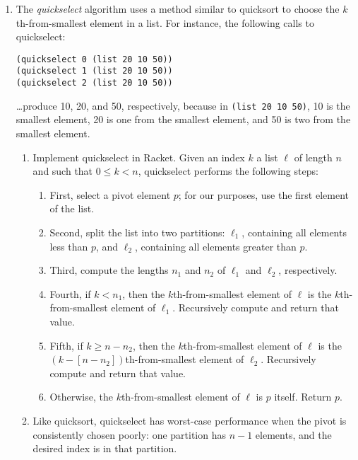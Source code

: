 \documentclass{article}
\begin{document}
\begin{enumerate}

  \pagebreak[2]
\item
  The \emph{quickselect} algorithm uses a method similar to quicksort to choose
  the \(k\)th-from-smallest element in a list.  For instance, the following
  calls to quickselect:
\begin{verbatim}
(quickselect 0 (list 20 10 50))
(quickselect 1 (list 20 10 50))
(quickselect 2 (list 20 10 50))
\end{verbatim}
  \dots produce 10, 20, and 50, respectively, because in
  \mbox{\texttt{(list~20~10~50)}}, 10 is the smallest element, 20 is one from
  the smallest element, and 50 is two from the smallest element.
  \begin{enumerate}
  \item
    Implement quickselect in Racket.  Given an index \(k\) a list \(\ell\) of
    length \(n\) and such that \(0 \leq k < n\), quickselect performs the
    following steps:
    \begin{enumerate}
    \item
      First, select a pivot element \(p\); for our purposes, use the first
      element of the list.
    \item
      Second, split the list into two partitions: \(\ell_1\), containing all
      elements less than \(p\), and \(\ell_2\), containing all elements greater
      than \(p\).
    \item
      Third, compute the lengths \(n_1\) and \(n_2\) of \(\ell_1\) and
      \(\ell_2\), respectively.
    \item
      Fourth, if \(k < n_1\), then the \(k\)th-from-smallest element of \(\ell\)
      is the \(k\)th-from-smallest element of \(\ell_1\).  Recursively compute
      and return that value.
    \item
      Fifth, if \(k \geq n - n_2\), then the \(k\)th-from-smallest element of
      \(\ell\) is the \((k - [n - n_2])\)th-from-smallest element of \(\ell_2\).
      Recursively compute and return that value.
    \item
      Otherwise, the \(k\)th-from-smallest element of \(\ell\) is \(p\) itself.
      Return \(p\).
    \end{enumerate}
  \item
    Like quicksort, quickselect has worst-case performance when the pivot is
    consistently chosen poorly: one partition has \(n-1\) elements, and the
    desired index is in that partition.
    \begin{enumerate}

\end{enumerate}
\end{enumerate}
\end{enumerate}
\end{document}
